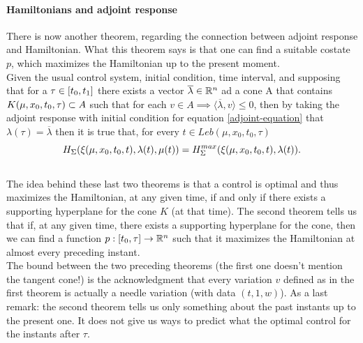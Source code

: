 \paragraph[5.13]{Hamiltonians and adjoint response}
There is now another theorem, regarding the connection between adjoint response and Hamiltonian. What this theorem says is that one can find a suitable costate $p$, which maximizes the Hamiltonian up to the present moment.\\
 Given the usual control system, initial condition, time interval, and supposing that for a $\tau\in[t_0,t_1]$ there exists a vector $\overline{\lambda}\in\mathbb{R}^n$ ad a cone A that contains $K(\mu,x_0,t_0,\tau)\subset A$ such that for each $v\in A \implies \langle \overline{\lambda},v\rangle\leq0$, then by taking the adjoint response with initial condition for equation \eqref{adjoint-equation} that $\lambda(\tau)=\overline{\lambda}$ then it is true that, for every $t\in Leb(\mu,x_0,t_0,\tau)$
\[ H_\Sigma(\xi(\mu,x_0,t_0,t),\lambda(t),\mu(t))=H_\Sigma^{max}(\xi(\mu,x_0,t_0,t),\lambda(t)). \]
\\
The idea behind these last two theorems is that  a control is optimal and thus maximizes the Hamiltonian, at any given time, if and only if there exists a supporting hyperplane for the cone $K$ (at that time).
The second theorem tells us that if, at any given time, there exists a supporting hyperplane for the cone, then we can find a function $p:[t_0,\tau]\rightarrow\mathbb{R}^n$ such that it maximizes the Hamiltonian at almost every preceding instant.\\
The bound between the two preceding theorems (the first one doesn't mention the tangent cone!) is the acknowledgment that every variation $v$ defined  as in the first theorem is actually a needle variation (with data $(t,1,w)$).
As a last remark: the second theorem tells us only something about the past instants up to the present one. It does not give us ways to predict what the optimal control for the instants after $\tau$.\\

